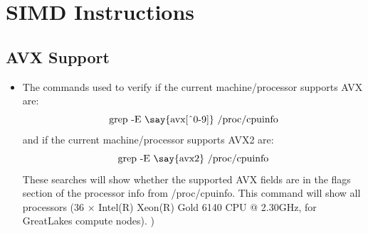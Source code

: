 \documentclass[letterpaper]{article}
\begin{document}
\section{SIMD Instructions}

\subsection{AVX Support}
\begin{itemize}
	\item The commands used to verify if the current machine/processor supports AVX are:
	$$ \textrm{grep -E \say{avx[\^{}0-9]} /proc/cpuinfo}$$
	and if the current machine/processor supports AVX2 are:
	$$ \textrm{grep -E \say{avx2} /proc/cpuinfo}$$
	These searches will show whether the supported AVX fields are in the flags section of the processor info from /proc/cpuinfo. This command will show all processors (36 $\times$ Intel(R) Xeon(R) Gold 6140 CPU @ 2.30GHz, for GreatLakes compute nodes).
)


\end{itemize}




\end{document}
